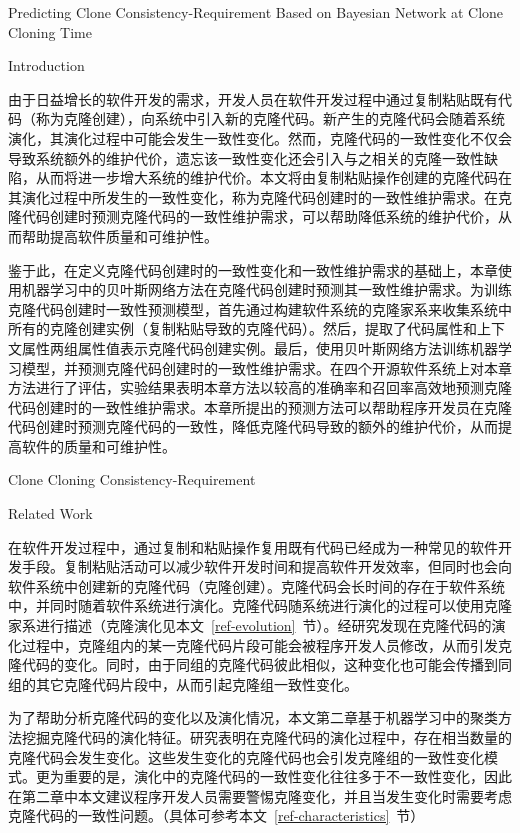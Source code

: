 
{Predicting Clone Consistency-Requirement Based on Bayesian Network at Clone Cloning Time}

{Introduction}

由于日益增长的软件开发的需求，开发人员在软件开发过程中通过复制粘贴既有代码（称为克隆创建），向系统中引入新的克隆代码。新产生的克隆代码会随着系统演化，其演化过程中可能会发生一致性变化。然而，克隆代码的一致性变化不仅会导致系统额外的维护代价，遗忘该一致性变化还会引入与之相关的克隆一致性缺陷，从而将进一步增大系统的维护代价。本文将由复制粘贴操作创建的克隆代码在其演化过程中所发生的一致性变化，称为克隆代码创建时的一致性维护需求。在克隆代码创建时预测克隆代码的一致性维护需求，可以帮助降低系统的维护代价，从而帮助提高软件质量和可维护性。

鉴于此，在定义克隆代码创建时的一致性变化和一致性维护需求的基础上，本章使用机器学习中的贝叶斯网络方法在克隆代码创建时预测其一致性维护需求。为训练克隆代码创建时一致性预测模型，首先通过构建软件系统的克隆家系来收集系统中所有的克隆创建实例（复制粘贴导致的克隆代码）。然后，提取了代码属性和上下文属性两组属性值表示克隆代码创建实例。最后，使用贝叶斯网络方法训练机器学习模型，并预测克隆代码创建时的一致性维护需求。在四个开源软件系统上对本章方法进行了评估，实验结果表明本章方法以较高的准确率和召回率高效地预测克隆代码创建时的一致性维护需求。本章所提出的预测方法可以帮助程序开发员在克隆代码创建时预测克隆代码的一致性，降低克隆代码导致的额外的维护代价，从而提高软件的质量和可维护性。

{Clone Cloning Consistency-Requirement}

{Related Work}

在软件开发过程中，通过复制和粘贴操作复用既有代码已经成为一种常见的软件开发手段\cite{koschke2007survey}。复制粘贴活动可以减少软件开发时间和提高软件开发效率，但同时也会向软件系统中创建新的克隆代码（克隆创建）。克隆代码会长时间的存在于软件系统中，并同时随着软件系统进行演化。克隆代码随系统进行演化的过程可以使用克隆家系进行描述\cite{kim2005empirical}（克隆演化见本文~\ref{ref-evolution}~节）。经研究发现在克隆代码的演化过程中，克隆组内的某一克隆代码片段可能会被程序开发人员修改，从而引发克隆代码的变化。同时，由于同组的克隆代码彼此相似，这种变化也可能会传播到同组的其它克隆代码片段中，从而引起克隆组一致性变化\cite{saha2011automatic}。

为了帮助分析克隆代码的变化以及演化情况，本文第二章基于机器学习中的聚类方法挖掘克隆代码的演化特征。研究表明在克隆代码的演化过程中，存在相当数量的克隆代码会发生变化。这些发生变化的克隆代码也会引发克隆组的一致性变化模式。更为重要的是，演化中的克隆代码的一致性变化往往多于不一致性变化，因此在第二章中本文建议程序开发人员需要警惕克隆变化，并且当发生变化时需要考虑克隆代码的一致性问题。（具体可参考本文~\ref{ref-characteristics}~节）

